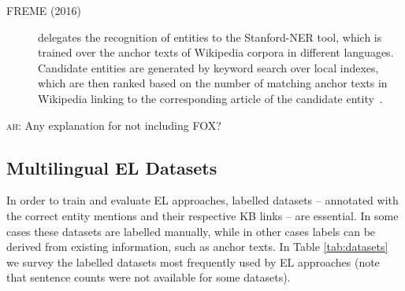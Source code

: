 \documentclass{llncs}
\newcommand{\ah}[1]{{\color{blue}\textsc{ah:} #1}}
\begin{document}
\begin{description}
\item[FREME (2016)] delegates the recognition of entities to the Stanford-NER tool, which is trained over the anchor texts of Wikipedia corpora in different languages. Candidate entities are generated by keyword search over local indexes, which are then ranked based on the number of matching anchor texts in Wikipedia linking to the corresponding article of the candidate entity~\cite{freme-ner2016}.
\end{description}

\ah{Any explanation for not including FOX?}





\subsection{Multilingual EL Datasets}

In order to train and evaluate EL approaches, labelled datasets -- annotated with the correct entity mentions and their respective KB links -- are essential. In some cases these datasets are labelled manually, while in other cases labels can be derived from existing information, such as anchor texts. In Table \ref{tab:datasets} we survey the labelled datasets most frequently used by EL approaches (note that sentence counts were not available for some datasets).
\end{document}
